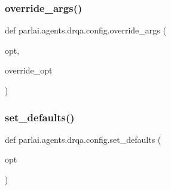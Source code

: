 \subsubsection{\texorpdfstring{override\+\_\+args()}{override\_args()}}
{\footnotesize\ttfamily def parlai.\+agents.\+drqa.\+config.\+override\+\_\+args (\begin{DoxyParamCaption}\item[{}]{opt,  }\item[{}]{override\+\_\+opt }\end{DoxyParamCaption})}

\mbox{\label{namespaceparlai_1_1agents_1_1drqa_1_1config_a8cc825bafeff299794cba6e2a8b65da2}} 
\subsubsection{\texorpdfstring{set\+\_\+defaults()}{set\_defaults()}}
{\footnotesize\ttfamily def parlai.\+agents.\+drqa.\+config.\+set\+\_\+defaults (\begin{DoxyParamCaption}\item[{}]{opt }\end{DoxyParamCaption})}


